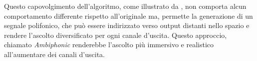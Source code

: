 Questo capovolgimento dell'algoritmo, come illustrato da \ms, non comporta alcun
comportamento differente rispetto all'originale ma, permette la generazione di un segnale
polifonico, che può essere indirizzato verso output distanti nello spazio e rendere
l'ascolto diversificato per ogni canale d'uscita. Questo approccio, chiamato \emph{Ambiphonic}
renderebbe l'ascolto più immersivo e realistico all'aumentare dei canali d'uscita.